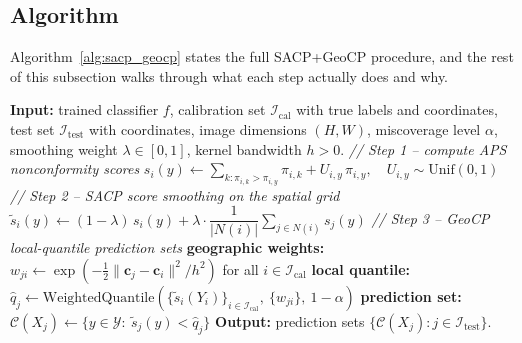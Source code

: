 \documentclass[11pt]{article}
\newcommand{\1}{\mathbf{1}}
\begin{document}
\subsection{Algorithm}
\label{subsec:algorithm}

Algorithm~\ref{alg:sacp_geocp} states the full SACP+GeoCP procedure, and the rest of this subsection walks through what each step actually does and why.

\begin{algorithm}[h]
\caption{SACP+GeoCP for pixel-level conformal prediction.}
\label{alg:sacp_geocp}
\begin{algorithmic}[1]
\State \textbf{Input:} trained classifier $f$, calibration set $\mathcal{I}_{\text{cal}}$ with true labels and coordinates, test set $\mathcal{I}_{\text{test}}$ with coordinates, image dimensions $(H, W)$, miscoverage level $\alpha$, smoothing weight $\lambda \in [0,1]$, kernel bandwidth $h > 0$.
\State \textit{// Step 1 -- compute APS nonconformity scores}
    \State $s_i(y) \gets \sum_{k:\pi_{i,k} > \pi_{i,y}} \pi_{i,k} + U_{i,y}\, \pi_{i,y}, \quad U_{i,y} \sim \mathrm{Unif}(0,1)$
\EndFor
\State \textit{// Step 2 -- SACP score smoothing on the spatial grid}
    \State $\tilde s_i(y) \gets (1-\lambda)\, s_i(y) + \lambda \cdot \dfrac{1}{|N(i)|}\sum_{j \in N(i)} s_j(y)$
\EndFor
\State \textit{// Step 3 -- GeoCP local-quantile prediction sets}
    \State \textbf{geographic weights:} $w_{ji} \gets \exp\!\left(-\tfrac{1}{2}\|\mathbf{c}_j - \mathbf{c}_i\|^2 / h^2\right)$ for all $i \in \mathcal{I}_{\text{cal}}$
    \State \textbf{local quantile:} $\hat q_j \gets \text{WeightedQuantile}\!\left(\{\tilde s_i(Y_i)\}_{i \in \mathcal{I}_{\text{cal}}},\ \{w_{ji}\},\ 1 - \alpha\right)$
    \State \textbf{prediction set:} $\mathcal{C}(X_j) \gets \{y \in \mathcal{Y} :\ \tilde s_j(y) < \hat q_j\}$
\EndFor
\State \textbf{Output:} prediction sets $\{\mathcal{C}(X_j) : j \in \mathcal{I}_{\text{test}}\}$.
\end{algorithmic}
\end{algorithm}
\end{document}
